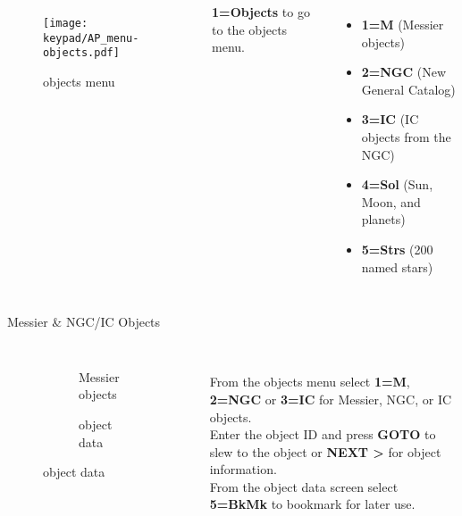 \begin{frame}[t]{\insertsubsectionhead}
  \begin{columns}[T]
    \begin{figure}[h]
        \texttt{[image: keypad/AP\_menu-objects.pdf]}
      \caption{objects menu}
    \end{figure}
   \textbf{1=Objects} to go to the objects menu.\\[1ex]

    \begin{itemize}
        \item[] \textbf{1=M} (Messier objects)
        \item[] \textbf{2=NGC} (New General Catalog)
        \item[] \textbf{3=IC}   (IC objects from the NGC)
        \item[] \textbf{4=Sol}   (Sun, Moon, and planets)
        \item[] \textbf{5=Strs}  (200 named stars)
    \end{itemize}
\end{columns}
\end{frame}


\begin{frame}[t]{Messier \& NGC/IC Objects}
  \begin{columns}[T]
    \begin{figure}[ht]
        \begin{subfigure}{0.67\textwidth}
        \caption{Messier objects}
      \end{subfigure}
      \vspace{\fill}
      \begin{subfigure}{0.67\textwidth}
        \caption{object data}
      \end{subfigure}
    \end{figure}
  \ \\[0.25ex]
  From the objects menu select \textbf{1=M}, \textbf{2=NGC} or \textbf{3=IC}
  for Messier, NGC, or IC objects.\\[1ex]

  Enter the object ID and press \textbf{GOTO} to slew to the object or
  \textbf{NEXT \textgreater} for object information. \\[1ex]

  From the object data screen select \textbf{5=BkMk} to bookmark for
  later use.
\end{columns}
\end{frame}

